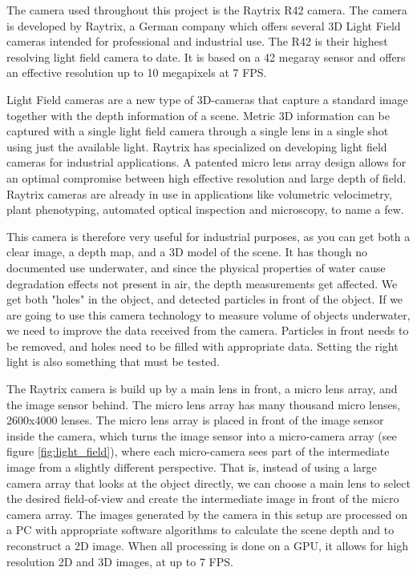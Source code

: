 The camera used throughout this project is the Raytrix R42 camera. The camera is developed by Raytrix, a German company which offers several 3D Light Field cameras intended for professional and industrial use. The R42 is their highest resolving light field camera to date. It is based on a 42 megaray sensor and offers an effective resolution up to 10 megapixels at 7 FPS. \cite{website:raytrix_r42}

Light Field cameras are a new type of 3D-cameras that capture a standard image together with the depth information of a scene. Metric 3D information can be captured with a single light field camera through a single lens in a single shot using just the available light. Raytrix has specialized on developing light field cameras for industrial applications. A patented micro lens array design allows for an optimal compromise between high effective resolution and large depth of field. Raytrix cameras are already in use in applications like volumetric velocimetry, plant phenotyping, automated optical inspection and microscopy, to name a few. \cite{website:raytrix_main}

This camera is therefore very useful for industrial purposes, as you can get both a clear image, a depth map, and a 3D model of the scene. It has though no documented use underwater, and since the physical properties of water cause degradation effects not present in air, the depth measurements get affected. We get both "holes" in the object, and detected particles in front of the object. If we are going to use this camera technology to measure volume of objects underwater, we need to improve the data received from the camera. Particles in front needs to be removed, and holes need to be filled with appropriate data. Setting the right light is also something that must be tested. 

The Raytrix camera is build up by a main lens in front, a micro lens array, and the image sensor behind. The micro lens array has many thousand micro lenses, 2600x4000 lenses. The micro lens array is placed in front of the image sensor inside the camera, which turns the image sensor into a micro-camera array (see figure \ref{fig:light_field}), where each micro-camera sees part of the intermediate image from a slightly different perspective. That is, instead of using a large camera array that looks at the object directly, we can choose a main lens to select the desired field-of-view and create the intermediate image in front of the micro camera array. The images generated by the camera in this setup are processed on a PC with appropriate software algorithms to calculate the scene depth and to reconstruct a 2D image. When all processing is done on a GPU, it allows for high resolution 2D and 3D images, at up to 7 FPS. \cite{website:raytrix_technology}

